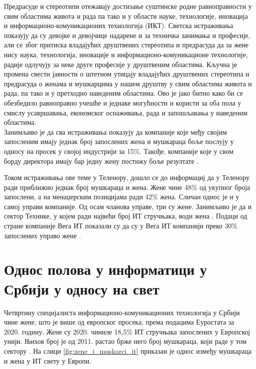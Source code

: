 \documentclass[a4paper]{article}
\begin{document}
Предрасуде и стереотипи отежавају достизање суштинске родне равноправности у
свим областима живота и рада па тако и у области науке, технологије, иновација
и информационо-комуникационих технологија (ИКТ). Светска истраживања показују
да су девојке и девојчице надарене и за техничка занимања и професије, али
се због притиска владајућих друштвених стереотипа и предрасуда да за жене
нису наука, технологија, иновације и информационо-комуникационе технологије,
радије одлучују за неке друге професије у друштвеним областима. Кључна је
промена свести јавности о штетном утицају владајућих друштвених стереотипа и
предрасуда о женама и мушкарцима у нашем друштву у свим областима живота
и рада, па тако и у претходно наведеним областима.
Ово је јако битно како би се обезбедило равноправно учешће и једнаке могућности и користи за 
оба пола у смислу усавршавања, економског оснаживања, рада и запошљавања у наведеним областима. \\

Занимљиво је да сва истраживања показују да компаније које међу својим запосленим имају једнак 
број запослених жена и мушкараца боље послују у односу на просек у својој индустрији за 15\%. 
Такође, компаније које у свом борду директора имају бар једну жену постижу боље резултате 
\cite{eu_it_sektor}.

Током истраживања ове теме у Теленору, дошло се до информациј да у Теленору ради приближно једнак 
број мушкараца и жена. Жене чине 48\% од укупног броја запослени, а на менаџерским позицијама ради
42\% жена. Сличан однос је и у самој управи компаније. Од осам чланова управе, три су жене. 
Занимљиво је да и сектор Технике, у којем ради највећи број ИТ стручњака, води жена 
\cite{telenor_it}. 
Подаци од стране компаније Вега ИТ показали су да су у Вега ИТ компанији преко 30\% запослених 
управо жене \cite{vega_it}.

\section{Однос полова у информатици у Србији у односу на свет}

Четвртину специјалиста информационо-комуникационих технологија у Србији чине жене, што је 
више од европског просека, према подацима Еуростата за 2020. годину. Жене су 2020. чиниле 18,5\% 
ИТ стручњака запослених у Европској унији. Њихов број је од 2011. растао брже него број мушкараца,
који раде у том сектору \cite{danas_it}. На слици \ref{fig:zene_i_muskarci_it} приказан је
однос између мушкараца и жена у ИТ свету у Европи. \\
\end{document}
